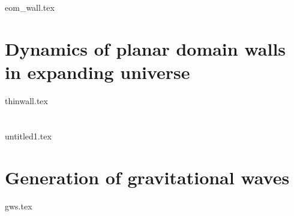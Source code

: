 





\section{}\label{sec:pertwalls:eom_wall}
    {{eom_wall.tex}}


\section{Dynamics of planar domain walls in expanding universe}\label{sec:pertwalls:thinwall}
    {{thinwall.tex}}


\section{}\label{sec:pertwalls:untitled1}
    {{untitled1.tex}}


\section{Generation of gravitational waves}\label{sec:pertwalls:gws}
    {{gws.tex}}






